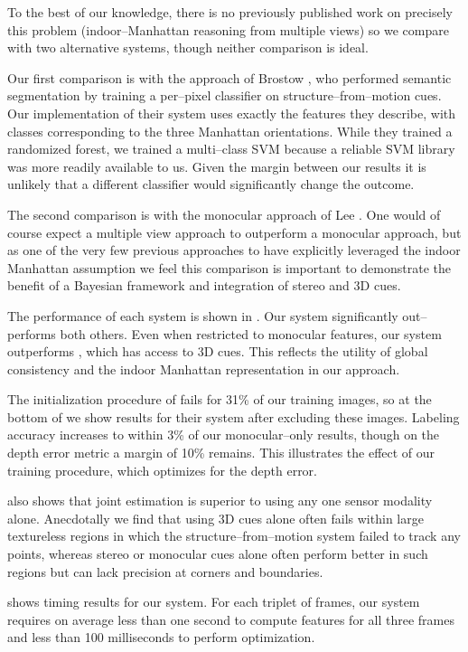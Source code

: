 To the best of our knowledge, there is no previously published work on
precisely this problem (indoor--Manhattan reasoning from multiple
views) so we compare with two alternative systems, though neither
comparison is ideal.

Our first comparison is with the approach of Brostow \etal
\cite{Brostow08}, who performed semantic segmentation by training a
per--pixel classifier on structure--from--motion cues. Our
implementation of their system uses exactly the features they
describe, with classes corresponding to the three Manhattan
orientations. While they trained a randomized forest, we trained a
multi--class SVM because a reliable SVM library was more readily
available to us. Given the margin between our results it is
unlikely that a different classifier would significantly change the
outcome.

The second comparison is with the monocular approach of
Lee \etal \cite{Lee09}. One would of course expect a multiple view
approach to outperform a monocular approach, but as one of the very
few previous approaches to have explicitly leveraged the indoor
Manhattan assumption we feel this comparison is important to
demonstrate the benefit of a Bayesian framework and integration of
stereo and 3D cues.

The performance of each system is shown in . Our
system significantly out--performs both others. Even when restricted
to monocular features, our system outperforms \cite{Brostow08}, which
has access to 3D cues. This reflects the utility of global consistency
and the indoor Manhattan representation in our approach.

The initialization procedure of \cite{Lee09} fails for 31\% of our
training images, so at the bottom of  we show
results for their system after excluding these images. Labeling
accuracy increases to within 3\% of our monocular--only results,
though on the depth error metric a margin of 10\% remains. This
illustrates the effect of our training procedure, which optimizes for the
depth error.

 also shows that joint estimation
is superior to using any one sensor modality alone. Anecdotally we
find that using 3D cues alone often fails within large textureless
regions in which the structure--from--motion system failed to track
any points, whereas stereo or monocular cues alone often perform
better in such regions but can lack precision at corners and
boundaries.

 shows timing results for our system. For each triplet
of frames, our system requires on average less than one second to
compute features for all three frames and less than 100 milliseconds to perform
optimization. 

